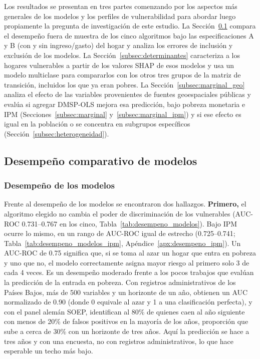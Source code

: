 \documentclass[12pt, letterpaper]{article}
\begin{document}
Los resultados se presentan en tres partes comenzando por los aspectos más generales 
de los modelos y los perfiles de vulnerabilidad para abordar 
luego propiamente la pregunta de investigación de este estudio. La
Sección~\ref{subsec:desempeno} compara el desempeño fuera de muestra de
los cinco algoritmos bajo las especificaciones A y B (con y sin ingreso/gasto) del
hogar y analiza los errores de inclusión y exclusión de los modelos. La
Sección~\ref{subsec:determinantes} caracteriza a los hogares vulnerables a
partir de los valores SHAP de esos modelos y usa un modelo
multiclase para compararlos con los otros tres grupos de la matriz de
transición, incluidos los que ya eran pobres. La
Sección~\ref{subsec:marginal_geo} analiza el efecto de las variables provenientes de
fuentes geoespaciales públicas y evalúa si agregar DMSP-OLS mejora esa
predicción, bajo pobreza monetaria e IPM
(Secciones~\ref{subsec:marginal} y~\ref{subsec:marginal_ipm}) y si ese
efecto es igual en la población o se concentra en subgrupos específicos
(Sección~\ref{subsec:heterogeneidad}).

\subsection{Desempeño comparativo de modelos}
\label{subsec:desempeno}

\subsubsection{Desempeño de los modelos}
\label{subsec:desempeno_modelos}

Frente al desempeño de los modelos se encontraron dos hallazgos.
\textbf{Primero,} el algoritmo elegido
no cambia el poder de discriminación de los vulnerables (AUC-ROC 0.731--0.767 en los cinco, Tabla~\ref{tab:desempeno_modelos}).
Bajo IPM ocurre lo mismo, en un rango de AUC-ROC igual de estrecho (0.725--0.741; Tabla~\ref{tab:desempeno_modelos_ipm},
Apéndice~\ref{apx:desempeno_ipm}).
Un AUC-ROC de 0.75 significa que, si se toma al azar un hogar que entra en pobreza y uno que no,
el modelo correctamente asigna mayor riesgo al primero solo 3 de cada 4 veces.
Es un desempeño moderado frente a los pocos trabajos que evalúan la
predicción de la entrada en pobreza. Con registros administrativos de los
Países Bajos, más de 500 variables y un horizonte de un año,
\textcite{burger2021} obtienen un AUC normalizado de 0.90 (donde 0
equivale al azar y 1 a una clasificación perfecta), y con el panel alemán
SOEP, \textcite{hohberg2018} identifican al 80\% de quienes caen al año
siguiente con menos de 20\% de falsos positivos en la mayoría de los
años, proporción que sube a cerca de 30\% con un horizonte de tres años.
Aquí la predicción se hace a tres años y con una encuesta, no con
registros administrativos, lo que hace esperable un techo más bajo.
\end{document}
